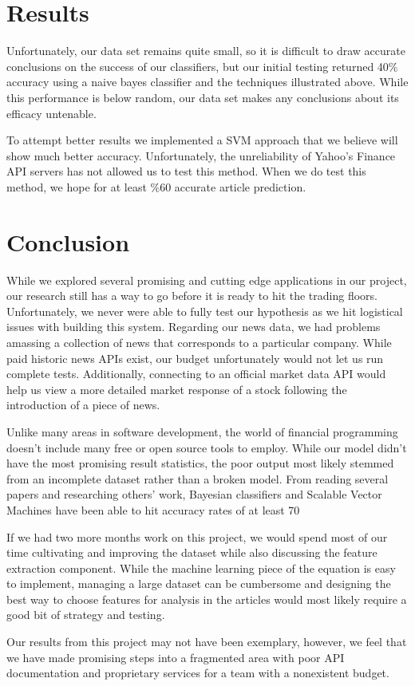\documentclass[letterpaper]{article}
\begin{document}
\section{Results}

\noindent Unfortunately, our data set remains quite small, so it is difficult to draw accurate conclusions on the success of our classifiers, but our initial testing returned 40\% accuracy using a naive bayes classifier and the techniques illustrated above. While this performance is below random, our data set makes any conclusions about its efficacy untenable.

To attempt better results we implemented a SVM approach that we believe will show much better accuracy. Unfortunately, the unreliability of Yahoo's Finance API servers has not allowed us to test this method. When we do test this method, we hope for at least \%60 accurate article prediction.

\section{Conclusion}
\noindent While we explored several promising and cutting edge applications in our project, our research still has a way to go before it is ready to hit the trading floors. Unfortunately, we never were able to fully test our hypothesis as we hit logistical issues with building this system. Regarding our news data, we had problems amassing a collection of news that corresponds to a particular company. While paid historic news APIs exist, our budget unfortunately would not let us run complete tests. Additionally, connecting to an official market data API would help us view a more detailed market response of a stock following the introduction of a piece of news.

Unlike many areas in software development, the world of financial programming doesn't include many free or open source tools to employ. While our model didn't have the most promising result statistics, the poor output most likely stemmed from an incomplete dataset rather than a broken model. From reading several papers and researching others' work, Bayesian classifiers and Scalable Vector Machines have been able to hit accuracy rates of at least 70%

If we had two more months work on this project, we would spend most of our time cultivating and improving the dataset while also discussing the feature extraction component. While the machine learning piece of the equation is easy to implement, managing a large dataset can be cumbersome and designing the best way to choose features for analysis in the articles would most likely require a good bit of strategy and testing.

Our results from this project may not have been exemplary, however, we feel that we have made promising steps into a fragmented area with poor API documentation and proprietary services for a team with a nonexistent budget.
\end{document}
